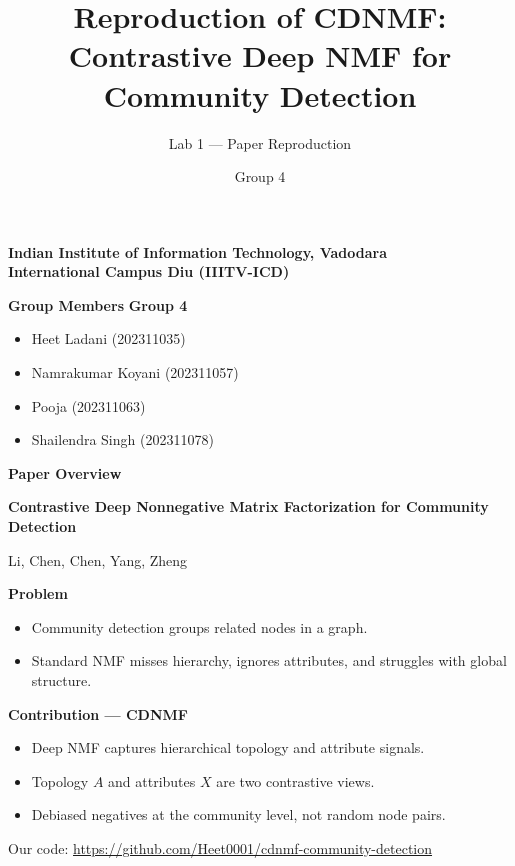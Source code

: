 \documentclass[10pt]{beamer}
\title{Reproduction of CDNMF:\\Contrastive Deep NMF for Community Detection}
\subtitle{Lab 1 --- Paper Reproduction}
\author{Group 4}
\date{}
\begin{document}
\begin{frame}
\titlepage
\vspace{-0.5cm}
\centering
\textbf{Indian Institute of Information Technology, Vadodara} \\[0.15cm]
\textbf{International Campus Diu (IIITV-ICD)}
\end{frame}

\begin{frame}{\textbf{Group Members}}
\centering
\Huge \textbf{Group 4} \\[0.65cm]
\large
\begin{itemize}
    \item Heet Ladani (202311035)
    \item Namrakumar Koyani (202311057)
    \item Pooja (202311063)
    \item Shailendra Singh (202311078)
\end{itemize}
\end{frame}

\begin{frame}{\textbf{Paper Overview}}

\textbf{Contrastive Deep Nonnegative Matrix Factorization for Community Detection}

\vspace{3pt}
Li, Chen, Chen, Yang, Zheng

\vspace{6pt}
\textbf{Problem}
\begin{itemize}
    \item Community detection groups related nodes in a graph.
    \item Standard NMF misses hierarchy, ignores attributes, and struggles with global structure.
\end{itemize}

\vspace{2pt}
\textbf{Contribution --- CDNMF}
\begin{itemize}
    \item Deep NMF captures hierarchical topology and attribute signals.
    \item Topology $A$ and attributes $X$ are two contrastive views.
    \item Debiased negatives at the community level, not random node pairs.
\end{itemize}

\vspace{6pt}
\small
Our code: \url{https://github.com/Heet0001/cdnmf-community-detection}
\end{frame}
\end{document}
